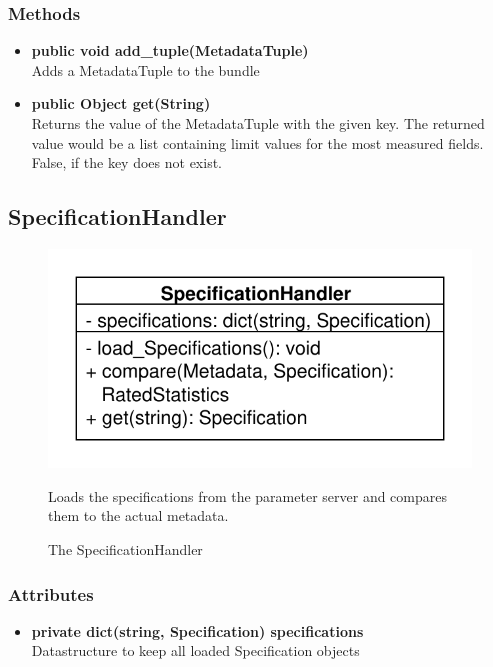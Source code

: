 \subsubsection{Methods}
\begin{itemize}
	\item \textbf{public void add\_tuple(MetadataTuple)}\\
	Adds a MetadataTuple to the bundle
	\item \textbf{public Object get(String)}\\
	Returns the value of the MetadataTuple with the given key. The returned value would be a list containing limit values for the most measured fields. False, if the key does not exist.
\end{itemize}

\newpage
\subsection{SpecificationHandler}
\begin{figure}[htbp]
	\begin{minipage}[t]{7cm}
		\vspace{0pt}
		\centering
		\includegraphics[scale=0.6]{./diagram_pictures/SpecificationHandler.pdf}
		\caption{The SpecificationHandler}
	\end{minipage}
	\hfill
	\begin{minipage}[t]{8cm}
		\vspace{10pt}
		Loads the specifications from the parameter server and compares them to the actual metadata.
	\end{minipage}
\end{figure}

\subsubsection{Attributes}
\begin{itemize}
	\item \textbf{private dict(string, Specification) specifications}\\
	Datastructure to keep all loaded Specification objects
\end{itemize}
